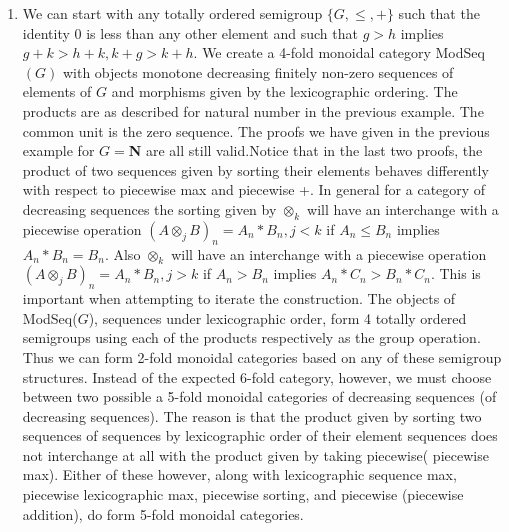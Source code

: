 \documentclass{tac}
\begin{document}
{\begin{enumerate}




\item
 We can start with any totally ordered semigroup $\{G,\le, +\}$ such that the identity
0 is less than any other element and such that $g>h$ implies $g+k > h+k, k+g> k+h.$
We create a 4-fold monoidal category ModSeq$(G)$ with objects monotone decreasing 
finitely non-zero sequences of elements of $G$ and morphisms given by the lexicographic ordering. 
The products are as described for natural number in the previous example.  The common unit is the zero sequence.   
The proofs we have given in 
the previous example for $G = ${\bf N} are all still valid.Notice that in the last two proofs, the 
product of two sequences given by sorting their elements
behaves differently with respect to piecewise max and piecewise +. In general for a category of decreasing sequences
the sorting given by $\otimes_k$ will have an interchange with a piecewise operation ${(A\otimes_j B)}_n = A_n*B_n, j < k$
if $ A_n \le B_n $ 
implies $A_n*B_n = B_n.$ Also $\otimes_k$ will have an interchange with a  piecewise operation ${(A\otimes_j B)}_n = A_n*B_n, j > k$
if $ A_n > B_n $ 
implies $A_n*C_n > B_n*C_n.$
This is important when attempting to
 iterate the construction. The objects of ModSeq($G$), sequences under lexicographic order,
 form 4 totally ordered semigroups
using each of the products respectively as the group operation. Thus we can form
2-fold monoidal categories based on any of these semigroup structures. Instead of 
the expected 6-fold category, however, we must choose between two possible a 5-fold monoidal categories
 of decreasing sequences (of decreasing sequences).
The reason is that the product given by sorting two sequences of sequences by lexicographic order of their element sequences
does not interchange at all with the product given by taking piecewise( piecewise max). Either of these however,
along with lexicographic sequence max, piecewise lexicographic max, piecewise sorting, and piecewise (piecewise addition),
do form 5-fold monoidal categories.


\end{enumerate}}
\end{document}
